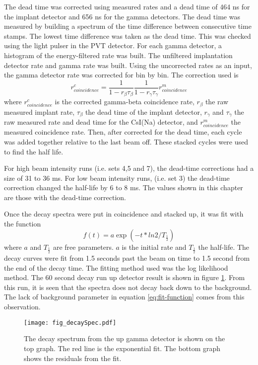 \documentclass[MaxHughesThesis.tex]{subfiles}
\begin{document}
The dead time was corrected using measured rates and a dead time of 464 ns for the implant detector and 656 ns for the gamma detectors.  
The dead time was measured by building a spectrum of the time difference between consecutive time stamps.
The lowest time difference was taken as the dead  time. 
This was checked using the light pulser in the PVT detector.
For each gamma detector, a histogram of the energy-filtered rate was built.
The unfiltered implantation detector rate and gamma rate was built.
Using the uncorrected rates as an input, the gamma detector rate was corrected for bin by bin.
The correction used is 
%
\begin{equation}
r^{c}_{coincidence} = \frac{1}{1 - r_{\beta}\tau_{\beta}}\frac{1}{1 - r_{\gamma}\tau_{\gamma}}r^{m}_{coincidence} 
	\label{eq:dtc} 
\end{equation}
%
where $r^{c}_{coincidence}$ is the corrected gamma-beta coincidence rate, $r_{\beta}$ the raw measured implant rate, $\tau_{\beta}$ the dead time of the implant detector, $r_{\gamma}$ and $\tau_{\gamma}$ the raw measured rate and dead time for the CsI(Na) detector, and $r^{m}_{coincidence}$ the measured coincidence rate.   
Then, after corrected for the dead time, each cycle was added together relative to the last beam off.
These stacked cycles were used to find the half life.

For high beam intensity runs (i.e. sets 4,5 and 7), the dead-time corrections had a size of 31 to 36 ms.
For low beam intensity runs, (i.e. set 3) the dead-time correction changed the half-life by 6 to 8 ms. 
The values shown in this chapter are those with the dead-time correction.

Once the decay spectra were put in coincidence and stacked up, it was fit with the function
%
\begin{equation}
	f(t) = a\exp{(-t*ln2/T_{\frac{1}{2}})}
	\label{eq:fit-function}
\end{equation}
%
where $a$ and $T_{\frac{1}{2}}$ are free parameters.
$a$ is the initial rate and $T_{\frac{1}{2}}$ the half-life.
The decay curves were fit from 1.5 seconds past the beam on time to 1.5 second from the end of the decay time. 
The fitting method used was the log likelihood method. 
The 60 second decay run up detector result is shown in figure \ref{fig:60secdecay}.
From this run, it is seen that the spectra does not decay back down to the background. 
The lack of background parameter in equation \ref{eq:fit-function} comes from this observation. 

\begin{figure}[!htb]
\centerline{\texttt{[image: fig\_decaySpec.pdf]}}
\caption{The decay spectrum from the up gamma detector is shown on the top graph.
	The red line is the exponential fit. 
	The bottom graph shows the residuals from the fit. 
	}
\label{fig:60secdecay}
\end{figure}
\end{document}
